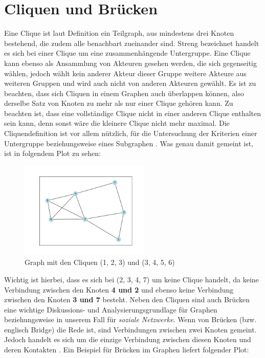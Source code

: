 \section{Cliquen und Brücken}
\label{ch:CliquenBrücken}
Eine Clique ist laut Definition ein Teilgraph, aus mindestens drei Knoten bestehend, die zudem alle benachbart zueinander sind. Streng bezeichnet handelt es sich bei einer Clique um eine zusammenhängende Untergruppe. Eine Clique kann ebenso als Ansammlung von Akteuren gesehen werden, die sich gegenseitig wählen, jedoch wählt kein anderer Akteur dieser Gruppe weitere Akteure aus weiteren Gruppen und wird auch nicht von anderen Akteuren gewählt. Es ist zu beachten, dass sich Cliquen in einem Graphen auch überlappen können, also derselbe Satz von Knoten zu mehr als nur einer Clique gehören kann. Zu beachten ist, dass eine vollständige Clique nicht in einer anderen Clique enthalten sein kann, denn sonst wäre die kleinere Clique nicht mehr maximal. Die Cliquendefinition ist vor allem nützlich, für die Untersuchung der Kriterien einer Untergruppe beziehungsweise eines Subgraphen \cite{wasserman1994social}. Was genau damit gemeint ist, ist in folgendem Plot zu sehen: 
\FloatBarrier
\begin{figure}[htb!]
    \centering
    \includegraphics[width=0.55\textwidth]{Graphics/Clique.png}
    \caption{Graph mit den Cliquen (1, 2, 3) und (3, 4, 5, 6)}
    \label{fig:Clique}
\end{figure}

\newpage
Wichtig ist hierbei, dass es sich bei (2, 3, 4, 7) um keine Clique handelt, da keine Verbindung zwischen den Knoten \textbf{4 und 2} und ebenso keine Verbindung zwischen den Knoten \textbf{3 und 7} besteht.
Neben den Cliquen sind auch Brücken eine wichtige Diskussions- und Analysierungsgrundlage für Graphen beziehungsweise in unserem Fall für \textit{soziale Netzwerke}. Wenn von Brücken (bzw. englisch Bridge) die Rede ist, sind Verbindungen zwischen zwei Knoten gemeint. Jedoch handelt es sich um die einzige Verbindung zwischen diesen Knoten und deren Kontakten \cite{bridge}. Ein Beispiel für Brücken im Graphen liefert folgender Plot:


